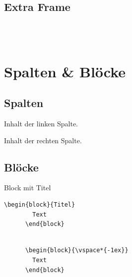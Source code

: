 \subsection{Extra Frame}
\begin{frame}[fragile]{\subsecname}

  \begin{lstlisting}[gobble=4]
    % Option [fragile] ist erforderlich!

    
  \end{lstlisting}

\end{frame}

\section{Spalten \& Blöcke}

\subsection{Spalten}
\begin{frame}{\subsecname}

  \begin{minipage}[t]{0.5\textwidth}
    \par\medskip
    Inhalt der linken Spalte.
  \end{minipage}%
  \begin{minipage}[t]{0.5\textwidth}
    \par\medskip
    Inhalt der rechten Spalte.
  \end{minipage}

\end{frame}

\subsection{Blöcke}
\begin{frame}[fragile]{\subsecname}

  \begin{block}{Block mit Titel}
    \begin{lstlisting}[gobble=6]
      \begin{block}{Titel}
        Text
      \end{block}
    \end{lstlisting}
  \end{block}

  \begin{block}{\vspace*{-1ex}}
    \begin{lstlisting}[gobble=6]
      % Block ohne Titel

      \begin{block}{\vspace*{-1ex}}
        Text
      \end{block}
    \end{lstlisting}
  \end{block}

\end{frame}

